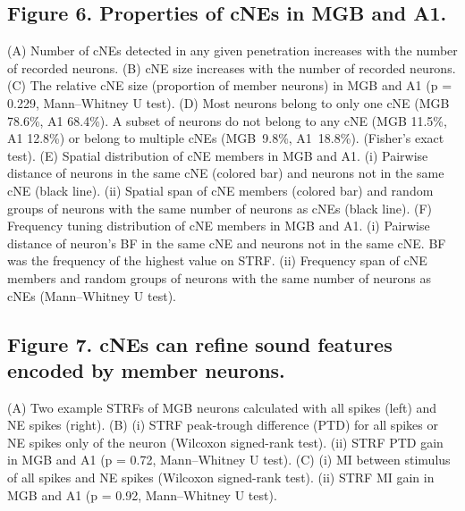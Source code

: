 \documentclass[11pt]{article}
\begin{document}
\subsection*{Figure 6. Properties of cNEs in MGB and A1.}
(A) Number of cNEs detected in any given penetration increases with the number of recorded neurons.
(B) cNE size increases with the number of recorded neurons.
(C) The relative cNE size (proportion of member neurons) in MGB and A1 (p = 0.229, Mann–Whitney U test). 
(D) Most neurons belong to only one cNE (MGB 78.6\%, A1 68.4\%). A subset of neurons do not belong to any cNE (MGB 11.5\%, A1 12.8\%) or belong to multiple cNEs (MGB~9.8\%, A1~18.8\%). (Fisher's exact test).
(E) Spatial distribution of cNE members in MGB and A1. (i) Pairwise distance of neurons in the same cNE (colored bar) and neurons not in the same cNE (black line). (ii) Spatial span of cNE members (colored bar) and random groups of neurons with the same number of neurons as cNEs (black line). (F) Frequency tuning distribution of cNE members in MGB and A1. (i) Pairwise distance of neuron's BF in the same cNE and neurons not in the same cNE. BF was the frequency of the highest value on STRF. (ii) Frequency span of cNE members and random groups of neurons with the same number of neurons as cNEs (Mann–Whitney U test).

\subsection*{Figure 7. cNEs can refine sound features encoded by member neurons.}
(A) Two example STRFs of MGB neurons calculated with all spikes (left) and NE spikes (right).
(B) (i) STRF peak-trough difference (PTD) for all spikes or NE spikes only of the neuron (Wilcoxon signed-rank test). (ii) STRF PTD gain in MGB and A1 (p = 0.72, Mann–Whitney U test).
(C) (i) MI between stimulus of all spikes and NE spikes (Wilcoxon signed-rank test). (ii) STRF MI gain in MGB and A1 (p = 0.92, Mann–Whitney U test).
\end{document}
